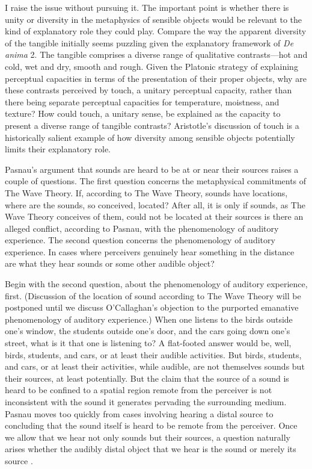 I raise the issue without pursuing it. The important point is whether there is unity or diversity in the metaphysics of sensible objects would be relevant to the kind of explanatory role they could play. Compare the way the apparent diversity of the tangible initially seems puzzling given the explanatory framework of \emph{De anima} 2. The tangible comprises a diverse range of qualitative contrasts---hot and cold, wet and dry, smooth and rough. Given the Platonic strategy of explaining perceptual capacities in terms of the presentation of their proper objects, why are these contrasts perceived by touch, a unitary perceptual capacity, rather than there being separate perceptual capacities for temperature, moistness, and texture? How could touch, a unitary sense, be explained as the capacity to present a diverse range of tangible contrasts? Aristotle's discussion of touch is a historically salient example of how diversity among sensible objects potentially limits their explanatory role.

Pasnau's argument that sounds are heard to be at or near their sources raises a couple of questions. The first question concerns the metaphysical commitments of The Wave Theory. If, according to The Wave Theory, sounds have locations, where are the sounds, so conceived, located? After all, it is only if sounds, as The Wave Theory conceives of them, could not be located at their sources is there an alleged conflict, according to Pasnau, with the phenomenology of auditory experience.  The second question concerns the phenomenology of auditory experience. In cases where perceivers genuinely hear something in the distance are what they hear sounds or some other audible object? 

Begin with the second question, about the phenomenology of auditory experience, first. (Discussion of the location of sound according to The Wave Theory will be postponed until we discuss O'Callaghan's \citeyear{OCallaghan:2007xy,OCallaghan:2009aa} objection to the purported emanative phenomenology of auditory experience.) When one listens to the birds outside one's window, the students outside one's door, and the cars going down one's street, what is it that one is listening to? A flat-footed answer would be, well, birds, students, and cars, or at least their audible activities. But birds, students, and cars, or at least their activities, while audible, are not themselves sounds but their sources, at least potentially. But the claim that the source of a sound is heard to be confined to a spatial region remote from the perceiver is not inconsistent with the sound it generates pervading the surrounding medium. Pasnau moves too quickly from cases involving hearing a distal source to concluding that the sound itself is heard to be remote from the perceiver. Once we allow that we hear not only sounds but their sources, a question naturally arises whether the audibly distal object that we hear is the sound or merely its source \citep[see][123, for a development of this worry]{OShaughnessy:2009aa}.

